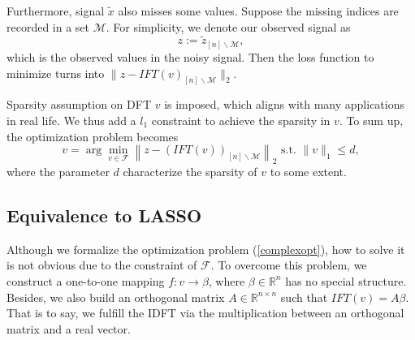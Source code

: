 \documentclass[final,onefignum,onetabnum]{siamart190516}
\begin{document}
Furthermore, signal $\widetilde{x}$ also misses some values. Suppose the missing indices are recorded in a set $\mathcal{M}$. For simplicity, we denote our observed signal as
\begin{equation}
    z:=\widetilde{z}_{[n]\backslash\mathcal{M}},
\end{equation}
which is the observed values in the noisy signal. Then the loss function to minimize turns into $\|z-IFT(v)_{[n]\backslash\mathcal{M}}\|_2$.

Sparsity assumption on DFT $v$ is imposed, which aligns with many applications in real life. We thus add a $l_1$ constraint to achieve the sparsity in $v$. To sum up, the optimization problem becomes
\begin{equation}\label{complexopt}
    v = \arg\min_{v\in\mathcal{F}}\left\|z - \left(IFT(v)\right)_{[n]\backslash\mathcal{M}}\right\|_2 \text{ s.t. }\|v\|_1 \leq d,
\end{equation}
where the parameter $d$ characterize the sparsity of $v$ to some extent.

\subsection{Equivalence to LASSO}
Although we formalize the optimization problem (\ref{complexopt}), how to solve it is not obvious due to the constraint of $\mathcal{F}$. To overcome this problem, we construct a one-to-one mapping $f:v\rightarrow\beta$, where $\beta\in\mathbb{R}^n$ has no special structure. Besides, we also build an orthogonal matrix $A\in\mathbb{R}^{n\times n}$ such that $IFT(v) = A\beta$. That is to say, we fulfill the IDFT via the multiplication between an orthogonal matrix and a real vector. 
\end{document}
